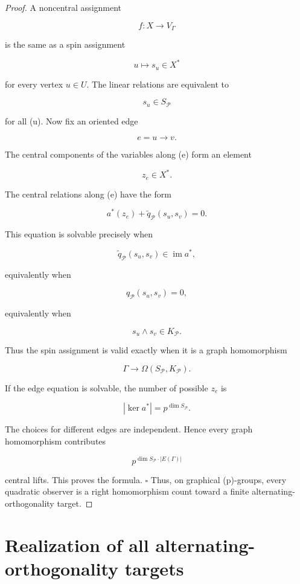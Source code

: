 \documentclass[11pt]{article}
\begin{document}
\begin{proof}
A noncentral assignment

\[
f:X\to V_\Gamma
\]

is the same as a spin assignment

\[
u\mapsto s_u\in X^*
\]

for every vertex $u\in U$. The linear relations are equivalent to

\[
s_u\in S_\mathcal P
\]

for all (u). Now fix an oriented edge

\[
e=u\to v.
\]

The central components of the variables along (e) form an element

\[
z_e\in X^*.
\]

The central relations along (e) have the form

\[
a^*(z_e)+\widetilde q_\mathcal P(s_u,s_v)=0.
\]

This equation is solvable precisely when

\[
\widetilde q_\mathcal P(s_u,s_v)\in\operatorname{im}a^*,
\]

equivalently when

\[
q_\mathcal P(s_u,s_v)=0,
\]

equivalently when

\[
s_u\wedge s_v\in K_\mathcal P.
\]

Thus the spin assignment is valid exactly when it is a graph homomorphism

\[
\Gamma\to\Omega(S_\mathcal P,K_\mathcal P).
\]

If the edge equation is solvable, the number of possible $z_e$ is

\[
|\ker a^*|=p^{\dim S_\mathcal P}.
\]

The choices for different edges are independent. Hence every graph homomorphism contributes

\[
p^{\dim S_\mathcal P\cdot |E(\Gamma)|}
\]

central lifts. This proves the formula. $\square$ Thus, on graphical (p)-groups, every quadratic observer is a right homomorphism count toward a finite alternating-orthogonality target.

\end{proof}

\section{Realization of all alternating-orthogonality targets}
\end{document}
